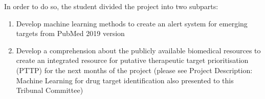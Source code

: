In order to do so, the student divided the project into two subparts:
\begin{enumerate}
\item Develop machine learning methods to create an alert system for emerging targets from PubMed 2019 version
\item Develop a comprehension about the publicly available biomedical resources to create an integrated resource for putative therapeutic target prioritisation (PTTP) for the next months of the project (please see Project Description: Machine Learning for drug target identification also presented to this Tribunal Committee)
\end{enumerate}
\newpage